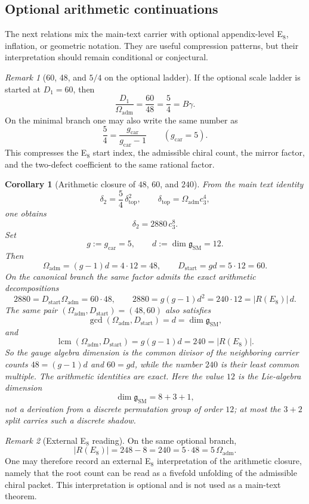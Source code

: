 \documentclass[11pt,a4paper]{article}
\newtheorem{corollary}[theorem]{Corollary}
\theoremstyle{definition}
\theoremstyle{remark}
\newtheorem*{remark}{Remark}
\newcommand{\cthree}{c_3}
\newcommand{\deltatop}{\delta_{\mathrm{top}}}
\newcommand{\SM}{\mathrm{SM}}
\newcommand{\Oadm}{\Omega_{\mathrm{adm}}}
\newcommand{\gcar}{g_{\mathrm{car}}}
\newcommand{\Dstart}{D_{\mathrm{start}}}
\begin{document}
\subsection{Optional arithmetic continuations}

The next relations mix the main-text carrier with optional appendix-level E$_8$, inflation, or geometric notation. They are useful compression patterns, but their interpretation should remain conditional or conjectural.

\begin{remark}[60, 48, and \texorpdfstring{$5/4$}{5/4} on the optional ladder]
If the optional scale ladder is started at $D_1=60$, then
\[
\frac{D_1}{\Oadm}=\frac{60}{48}=\frac54=B\gamma.
\]
On the minimal branch one may also write the same number as
\[
\frac54=\frac{\gcar}{\gcar-1}\qquad (\gcar=5).
\]
This compresses the E$_8$ start index, the admissible chiral count, the mirror factor, and the two-defect coefficient to the same rational factor.
\end{remark}

\begin{corollary}[Arithmetic closure of $48$, $60$, and $240$]\label{rem:defect-factorization-gcd-lcm}
From the main text identity
\[
\delta_2=\frac{5}{4}\,\deltatop^2,
\qquad
\deltatop=\Oadm\cthree^4,
\]
one obtains
\[
\delta_2=2880\,\cthree^8.
\]
Set
\[
g:=\gcar=5,
\qquad
d:=\dim\mathfrak g_{\SM}=12.
\]
Then
\[
\Oadm=(g-1)d=4\cdot 12=48,
\qquad
\Dstart=gd=5\cdot 12=60.
\]
On the canonical branch the same factor admits the exact arithmetic decompositions
\[
2880=\Dstart\Oadm=60\cdot48,
\qquad
2880=g(g-1)d^2=240\cdot12=|R(E_8)|\,d.
\]
The same pair $(\Oadm,\Dstart)=(48,60)$ also satisfies
\[
\gcd(\Oadm,\Dstart)
=
d=\dim \mathfrak g_{\SM},
\]
and
\[
\operatorname{lcm}(\Oadm,\Dstart)
=
g(g-1)d
=
240
=
|R(E_8)|.
\]
So the gauge algebra dimension is the common divisor of the neighboring carrier counts
$48=(g-1)d$ and $60=gd$, while the number $240$ is their least common multiple. The arithmetic
identities are exact. Here the value $12$ is the Lie-algebra dimension
\[
\dim\mathfrak g_{\SM}=8+3+1,
\]
not a derivation from a discrete permutation group of order $12$; at most the $3+2$ split carries
such a discrete shadow.
\end{corollary}

\begin{remark}[External E$_8$ reading]
On the same optional branch,
\[
|R(E_8)|=248-8=240=5\cdot48=5\,\Oadm.
\]
One may therefore record an external E$_8$ interpretation of the arithmetic closure, namely that
the root count can be read as a fivefold unfolding of the admissible chiral packet. This
interpretation is optional and is not used as a main-text theorem.
\end{remark}
\end{document}
